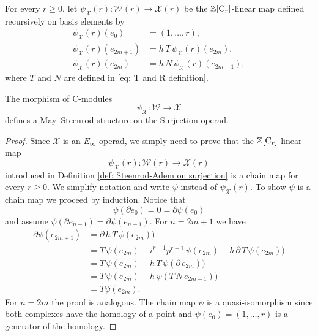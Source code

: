 \begin{definition} \label{def: Steenrod-Adem on surjection}
	For every $r \geq 0$, let $\psi_{\mathcal X}(r) \colon \mathcal W(r) \to \mathcal X(r)$ be the $\mathbb{Z}[\mathrm{C}_r]$-linear map defined recursively on basis elements by
	\begin{align*}
	\psi_{\mathcal X}(r)(e_0) & = (1, \dots, r), \\
	\psi_{\mathcal X}(r)(e_{2m+1}) & = h\,T\,\psi_{\mathcal X}(r)(e_{2m}), \\
	\psi_{\mathcal X}(r)(e_{2m}) & = h\,N\,\psi_{\mathcal X}(r)(e_{2m-1}),
	\end{align*}
	where $T$ and $N$ are defined in \eqref{eq: T and R definition}.
\end{definition}

\begin{theorem} \label{thm: Steenrod-Adem on surjection MS convention}
	The morphism of $\mathrm{C}$-modules
	\begin{equation*}
	\psi_{\mathcal X} \colon \mathcal W \to \mathcal X
	\end{equation*}
	defines a May--Steenrod structure on the Surjection operad.
\end{theorem}

\begin{proof}
	Since $\mathcal X$ is an $E_\infty$-operad, we simply need to prove that the $\mathbb{Z}[\mathrm{C}_r]$-linear map
	\begin{equation*}
	\psi_{\mathcal X}(r) \colon \mathcal W(r) \to \mathcal X(r)
	\end{equation*}
	introduced in Definition \ref{def: Steenrod-Adem on surjection} is a chain map for every $r \geq 0$.
	We simplify notation and write $\psi$ instead of $\psi_{\mathcal X}(r)$.
	To show $\psi$ is a chain map we proceed by induction.
	Notice that
	\begin{equation*}
	\psi(\partial e_0) = 0 = \partial \psi(e_0)
	\end{equation*}
	and assume $\psi(\partial e_{n-1}) = \partial \psi(e_{n-1})$.
	For $n = 2m+1$ we have
	\begin{align*}
	\partial \psi(e_{2m+1})
	& =
	\partial\, h\, T\, \psi(e_{2m}) \big) \\
	& =
	T\, \psi(e_{2m}) - i^{r-1} p^{r-1}\, \psi(e_{2m}) -
	h\, \partial\, T\, \psi(e_{2m}) \big) \\
	& =
	T\, \psi(e_{2m}) -
	h\, T\, \psi(\partial\, e_{2m}) \big) \\
	& =
	T\, \psi(e_{2m}) -
	h\, \psi(T\,N\, e_{2m-1}) \big) \\
	& =
	T \psi(e_{2m}).
	\end{align*}
	For $n = 2m$ the proof is analogous.
	The chain map $\psi$ is a quasi-isomorphism since both complexes have the homology of a point and $\psi(e_0) = (1, \dots, r)$ is a generator of the homology.
\end{proof}

